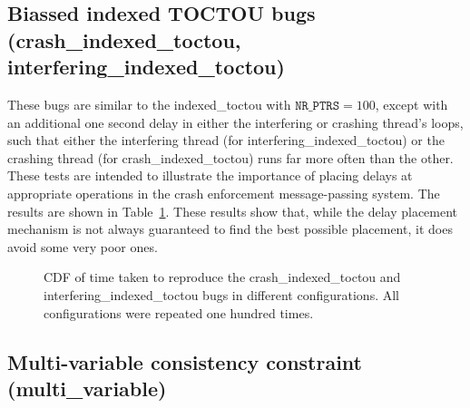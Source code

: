 \subsection{Biassed indexed TOCTOU bugs (crash\_indexed\_toctou, interfering\_indexed\_toctou)}

These bugs are similar to the indexed\_toctou with $\texttt{NR\_PTRS}
= 100$, except with an additional one second delay in either the
interfering or crashing thread's loops, such that either the
interfering thread (for interfering\_indexed\_toctou) or the crashing
thread (for crash\_indexed\_toctou) runs far more often than the
other.  These tests are intended to illustrate the importance of
placing delays at appropriate operations in the crash enforcement
message-passing system.  The results are shown in
Table~\ref{fig:biassed_indexed_toctou:times}.  These results show
that, while the delay placement mechanism is not always guaranteed to
find the best possible placement, it does avoid some very poor ones.

\begin{figure}
  
  \caption{CDF of time taken to reproduce the crash\_indexed\_toctou
    and interfering\_indexed\_toctou bugs in different configurations.
    All configurations were repeated one hundred times.}
  \label{fig:biassed_indexed_toctou:times}
\end{figure}

\subsection{Multi-variable consistency constraint (multi\_variable)}


